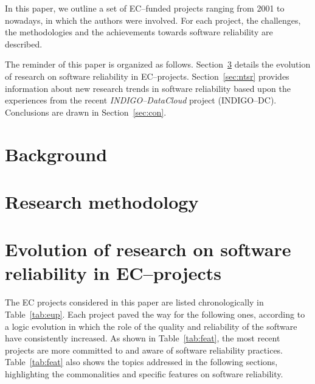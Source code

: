 \documentclass[journal]{IEEEtran}
\begin{document}
In this paper, we outline a set of EC--funded projects
ranging from 2001 to nowadays, in which the authors were involved.
For each project, the challenges, the methodologies and
the achievements towards software reliability are described.

The reminder of this paper is
organized as follows. Section~\ref{sec:ev} details the evolution of research on
software reliability in EC--projects. Section~\ref{sec:ntsr} provides
information about new research trends in software reliability based upon the
experiences from the recent {\sl INDIGO--DataCloud} project (INDIGO--DC). Conclusions are drawn in Section~\ref{sec:con}.

\section{Background}
\label{sec:b}




\section{Research methodology}
\label{sec:rm}




\section{Evolution of research on software reliability in EC--projects}
\label{sec:ev}

The EC projects considered in this paper are listed chronologically in Table~\ref{tab:eup}.
Each project paved the way for the following ones, according to a logic evolution in which
the role of the quality and reliability of the software have
consistently increased. As shown in Table~\ref{tab:feat}, the most recent projects are more
committed to and aware of software reliability practices.
Table~\ref{tab:feat} also shows the topics addressed in the following sections, highlighting
the commonalities and specific features on software reliability.
\end{document}

